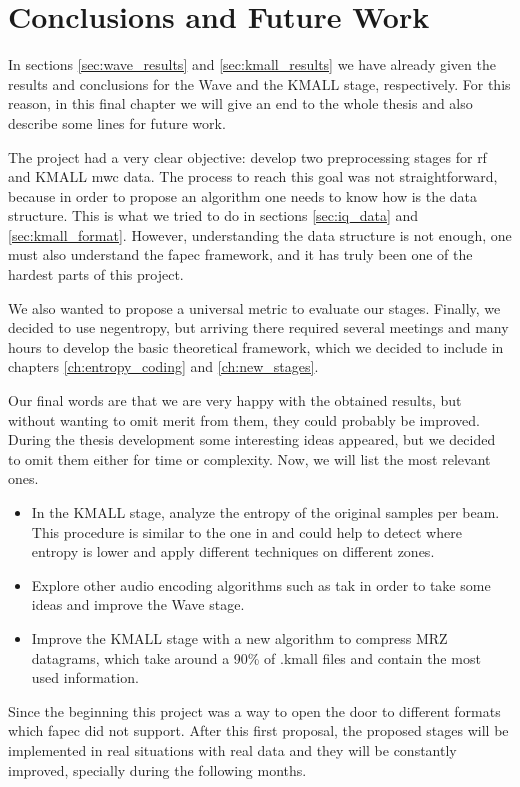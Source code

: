 \chapter{Conclusions and Future Work}
In sections \ref{sec:wave_results} and \ref{sec:kmall_results} we have already given the results and conclusions for the Wave and the KMALL stage, respectively. For this reason, in this final chapter we will give an end to the whole thesis and also describe some lines for future work.

The project had a very clear objective: develop two preprocessing stages for \acrfull{rf} and KMALL \acrshort{mwc} data. The process to reach this goal was not straightforward, because in order to propose an algorithm one needs to know how is the data structure. This is what we tried to do in sections \ref{sec:iq_data} and \ref{sec:kmall_format}. However, understanding the data structure is not enough, one must also understand the \acrshort{fapec} framework, and it has truly been one of the hardest parts of this project.

We also wanted to propose a universal metric to evaluate our stages. Finally, we decided to use negentropy, but arriving there required several meetings and many hours to develop the basic theoretical framework, which we decided to include in chapters \ref{ch:entropy_coding} and \ref{ch:new_stages}.

Our final words are that we are very happy with the obtained results, but without wanting to omit merit from them, they could probably be improved. During the thesis development some interesting ideas appeared, but we decided to omit them either for time or complexity. Now, we will list the most relevant ones.
\begin{itemize}
	\item In the KMALL stage, analyze the entropy of the original samples per beam. This procedure is similar to the one in \parencite{MBESComp} and could help to detect where entropy is lower and apply different techniques on different zones.
	\item Explore other audio encoding algorithms such as \acrshort{tak} in order to take some ideas and improve the Wave stage.
	\item Improve the KMALL stage with a new algorithm to compress MRZ datagrams, which take around a 90\% of .kmall files and contain the most used information.
\end{itemize}

Since the beginning this project was a way to open the door to different formats which \acrshort{fapec} did not support. After this first proposal, the proposed stages will be implemented in real situations with real data and they will be constantly improved, specially during the following months.